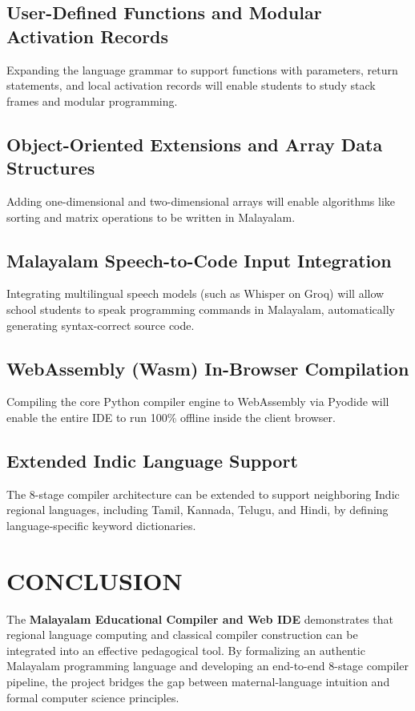 \documentclass[12pt,a4paper]{report}
\begin{document}
\section{User-Defined Functions and Modular Activation Records}
Expanding the language grammar to support functions with parameters, return statements, and local activation records will enable students to study stack frames and modular programming.

\section{Object-Oriented Extensions and Array Data Structures}
Adding one-dimensional and two-dimensional arrays will enable algorithms like sorting and matrix operations to be written in Malayalam.

\section{Malayalam Speech-to-Code Input Integration}
Integrating multilingual speech models (such as Whisper on Groq) will allow school students to speak programming commands in Malayalam, automatically generating syntax-correct source code.

\section{WebAssembly (Wasm) In-Browser Compilation}
Compiling the core Python compiler engine to WebAssembly via Pyodide will enable the entire IDE to run 100\% offline inside the client browser.

\section{Extended Indic Language Support}
The 8-stage compiler architecture can be extended to support neighboring Indic regional languages, including Tamil, Kannada, Telugu, and Hindi, by defining language-specific keyword dictionaries.

\newpage
\chapter{CONCLUSION}

The \textbf{Malayalam Educational Compiler and Web IDE} demonstrates that regional language computing and classical compiler construction can be integrated into an effective pedagogical tool. By formalizing an authentic Malayalam programming language and developing an end-to-end 8-stage compiler pipeline, the project bridges the gap between maternal-language intuition and formal computer science principles.
\end{document}
